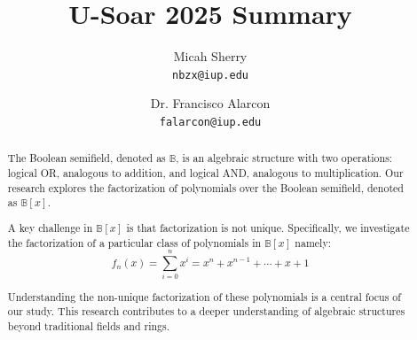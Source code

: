 

\usepackage[english]{babel}
\usepackage[letterpaper, top=2.5cm, bottom=2.5cm, left=2.5cm, right=2.5cm, marginparwidth=1.75cm]{geometry}

\usepackage{amsmath,amsthm,amssymb}
\usepackage{bbold}
\usepackage{graphicx}
\usepackage{listings}
\usepackage{multicol}
\usepackage{setspace}
\usepackage{enumitem}
\usepackage{float}
\usepackage{apacite}
\newcommand{\Z}{\mathbb{Z}}
\newcommand{\N}{\mathbb{N}}
\newcommand{\R}{\mathbb{R}}
\newcommand{\Q}{\mathbb{Q}}
\newcommand{\C}{\mathbb{C}}
\newcommand{\B}{\mathbb{B}}
\newcommand{\nullset}{\varnothing}
\newcommand{\powerset}[1]{\mathcal{P} ({#1})}
\newcommand{\ol}[1]{\overline{#1}}

\newcommand{\divides}{\mid}
\newcommand{\notdivides}{\nmid}

\newcommand{\st}{\text{ such that }}
\newcommand{\pmi}{\text{ principle of mathematical induction }}

\newcommand{\nitem}[1] %
{
    \setcounter{enumi}{#1}
    \addtocounter{enumi}{-1}
    \item
}
\usepackage{multicol}
\newtheorem{theorem}{Theorem}[section]
\newtheorem{lemma}{Lemma}[section]
\title{U-Soar 2025 Summary}
\author{
    Micah Sherry \\
    \texttt{nbzx@iup.edu}
    \and
    Dr. Francisco Alarcon\\
    \texttt{falarcon@iup.edu}
}



    \maketitle

    \begin{abstract}
        The Boolean semifield, denoted as $\B$, is an algebraic structure with two operations: logical OR, analogous to addition, and
        logical AND, analogous to multiplication. Our research explores the factorization of polynomials over the Boolean semifield, denoted as $\B[x]$.
        
        A key challenge in $\B[x]$ is that factorization is not unique. Specifically, we investigate the factorization of a particular
        class of polynomials in $\B[x]$ namely: $$f_n(x) = \sum_{i=0}^{n} x^i = x^n + x^{n-1} + \cdots + x + 1$$
        
        Understanding the non-unique factorization of these polynomials is a central focus of our study. This research contributes to a
        deeper understanding of algebraic structures beyond traditional fields and rings.
    \end{abstract}

